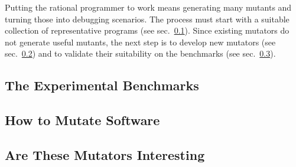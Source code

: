 
Putting the rational programmer to work means generating many mutants and turning
those into debugging scenarios. The process must start with a suitable
collection of representative programs (see sec.~\ref{sub:mutate-benchmarks}).
Since existing mutators do not generate useful mutants, the next step is to
develop new mutators (see sec.~\ref{sub:mutate-mutators}) and to validate their
suitability on the benchmarks (see sec.~\ref{sub:mutate-interesting}).

\def\sub#1#2{\subsection{#2} \label{sub:mutate-#1} }


\sub{benchmarks}{The Experimental Benchmarks}

\sub{mutators}   {How to Mutate Software} 
\sub{interesting}{Are These Mutators Interesting} 
